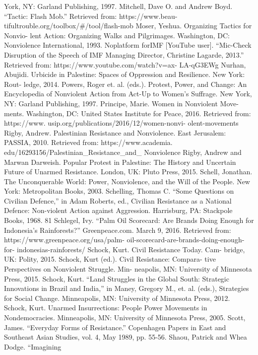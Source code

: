 \documentclass[twoside,a4paper,12pt,fleqn,openany]{extbook}
\begin{document}
York, NY: Garland Publishing, 1997.
Mitchell, Dave O. and Andrew Boyd. “Tactic:
Flash Mob.” Retrieved from: https://www.beau-
tifultrouble.org/toolbox/#/tool/flash-mob
Moser, Yeshua. Organizing Tactics for Nonvio-
lent Action: Organizing Walks and Pilgrimages.
Washington, DC: Nonviolence International,
1993.
Noplatform forIMF [YouTube user]. “Mic-Check
Disruption of the Speech of IMF Managing
Director, Christine Lagarde, 2013.” Retrieved
from: https://www.youtube.com/watch?v=ax-
LA-qG3EWg
Nurhan, Abujidi. Urbicide in Palestine: Spaces
of Oppression and Resilience. New York: Rout-
ledge, 2014.
Powers, Roger et. al. (eds.). Protest, Power, and
Change: An Encyclopedia of Nonviolent Action
from Act-Up to Women’s Suffrage. New York,
NY: Garland Publishing, 1997.
Principe, Marie. Women in Nonviolent Move-
ments. Washington, DC: United States Institute
for Peace, 2016. Retrieved from: https://www.
usip.org/publications/2016/12/women-nonvi-
olent-movements
Rigby, Andrew. Palestinian Resistance and
Nonviolence. East Jerusalem: PASSIA, 2010.
Retrieved from: https://www.academia.
edu/16293156/Palestinian_Resistance_and_
Nonviolence
Rigby, Andrew and Marwan Darweish. Popular
Protest in Palestine: The History and Uncertain
Future of Unarmed Resistance. London, UK:
Pluto Press, 2015.
Schell, Jonathan. The Unconquerable World:
Power, Nonviolence, and the Will of the People.
New York: Metropolitan Books, 2003.
Schelling, Thomas C. “Some Questions on
Civilian Defence,” in Adam Roberts, ed., Civilian
Resistance as a National Defence: Non-violent
Action against Aggression. Harrisburg, PA:
Stackpole Books, 1968.
81
Schlegel, Ivy. “Palm Oil Scorecard: Are Brands
Doing Enough for Indonesia’s Rainforests?”
Greenpeace.com. March 9, 2016. Retrieved
from: https://www.greenpeace.org/usa/palm-
oil-scorecard-are-brands-doing-enough-for-
indonesias-rainforests/
Schock, Kurt. Civil Resistance Today. Cam-
bridge, UK: Polity, 2015.
Schock, Kurt (ed.). Civil Resistance: Compara-
tive Perspectives on Nonviolent Struggle. Min-
neapolis, MN: University of Minnesota Press,
2015.
Schock, Kurt. “Land Struggles in the Global
South: Strategic Innovations in Brazil and India,”
in Maney, Gregory M., et. al. (eds.), Strategies
for Social Change. Minneapolis, MN: University
of Minnesota Press, 2012.
Schock, Kurt. Unarmed Insurrections: People
Power Movements in Nondemocracies.
Minneapolis, MN: University of Minnesota
Press, 2005.
Scott, James. “Everyday Forms of Resistance.”
Copenhagen Papers in East and Southeast
Asian Studies, vol. 4, May 1989, pp. 55-56.
Shaou, Patrick and Whea Dodge. “Imagining
\end{document}

